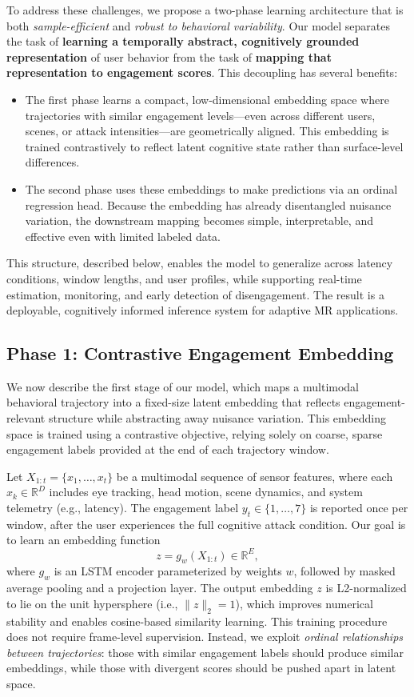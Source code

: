 \documentclass[review]{vgtc}                 %
\begin{document}
To address these challenges, we propose a two-phase learning architecture that is both \textit{sample-efficient} and \textit{robust to behavioral variability}. Our model separates the task of \textbf{learning a temporally abstract, cognitively grounded representation} of user behavior from the task of \textbf{mapping that representation to engagement scores}. This decoupling has several benefits:
\begin{itemize}
    \item The first phase learns a compact, low-dimensional embedding space where trajectories with similar engagement levels---even across different users, scenes, or attack intensities---are geometrically aligned. This embedding is trained contrastively to reflect latent cognitive state rather than surface-level differences.
    
    \item The second phase uses these embeddings to make predictions via an ordinal regression head. Because the embedding has already disentangled nuisance variation, the downstream mapping becomes simple, interpretable, and effective even with limited labeled data.
\end{itemize}
This structure, described below, enables the model to generalize across latency conditions, window lengths, and user profiles, while supporting real-time estimation, monitoring, and early detection of disengagement. The result is a deployable, cognitively informed inference system for adaptive MR applications.

\subsection{Phase 1: Contrastive Engagement Embedding}

We now describe the first stage of our model, which maps a multimodal behavioral trajectory into a fixed-size latent embedding that reflects engagement-relevant structure while abstracting away nuisance variation. This embedding space is trained using a contrastive objective, relying solely on coarse, sparse engagement labels provided at the end of each trajectory window.

Let \( X_{1:t} = \{x_1, \dots, x_t\} \) be a multimodal sequence of sensor features, where each \( x_k \in \mathbb{R}^D \) includes eye tracking, head motion, scene dynamics, and system telemetry (e.g., latency). The engagement label \( y_t \in \{1, \dots, 7\} \) is reported once per window, after the user experiences the full cognitive attack condition. Our goal is to learn an embedding function
\[
z = g_w(X_{1:t}) \in \mathbb{R}^E,
\]
where \( g_w \) is an LSTM encoder parameterized by weights \( w \), followed by masked average pooling and a projection layer. The output embedding \( z \) is L2-normalized to lie on the unit hypersphere (i.e., \( \|z\|_2 = 1 \)), which improves numerical stability and enables cosine-based similarity learning. This training procedure does not require frame-level supervision. Instead, we exploit {\em ordinal relationships between trajectories}: those with similar engagement labels should produce similar embeddings, while those with divergent scores should be pushed apart in latent space.
\end{document}
